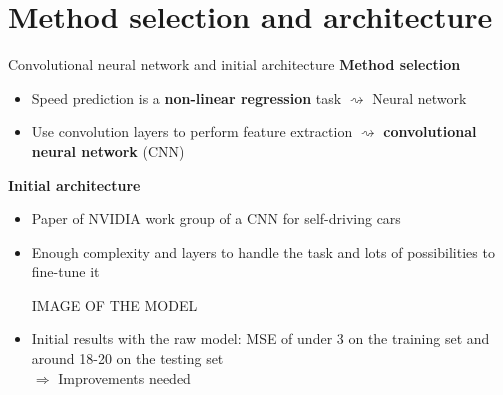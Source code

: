 \section{Method selection and architecture}

\begin{frame}{Convolutional neural network and initial architecture}
\textbf{Method selection}
\begin{itemize}
\item Speed prediction is a \textbf{non-linear regression} task $\rightsquigarrow$ Neural network
\item Use convolution layers to perform feature extraction $\rightsquigarrow$ \textbf{convolutional neural network} (CNN)
\end{itemize}
\textbf{Initial architecture}
\begin{itemize}
\item Paper of NVIDIA work group \cite{NVIDIA2016} of a CNN for self-driving cars
\item Enough complexity and layers to handle the task and lots of possibilities to fine-tune it

IMAGE OF THE MODEL

\item Initial results with the raw model: MSE of under 3 on the training set and around 18-20 on the testing set\\
$\Rightarrow$ Improvements needed
\end{itemize}
\end{frame}